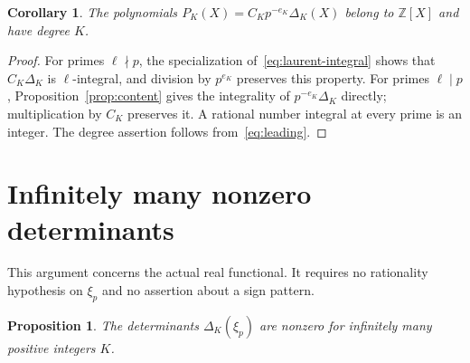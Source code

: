 \documentclass[11pt]{article}
\newtheorem{proposition}[theorem]{Proposition}
\newtheorem{corollary}[theorem]{Corollary}
\theoremstyle{remark}
\newcommand{\Z}{\mathbb Z}
\begin{document}
\begin{corollary}\label{cor:integer-polys}
The polynomials
$P_K(X)=C_Kp^{-e_K}\Delta_K(X)$ belong to $\Z[X]$ and have degree $K$.
\end{corollary}
\begin{proof}
For primes $\ell\nmid p$, the specialization
of~\eqref{eq:laurent-integral} shows that $C_K\Delta_K$ is
$\ell$-integral, and division by $p^{e_K}$ preserves this property.
For primes $\ell\mid p$, Proposition~\ref{prop:content} gives the
integrality of $p^{-e_K}\Delta_K$ directly; multiplication by $C_K$
preserves it. A rational number integral at every prime is an integer.
The degree assertion follows from~\eqref{eq:leading}.
\end{proof}

\section{Infinitely many nonzero determinants}

This argument concerns the actual real functional. It requires no
rationality hypothesis on $\xi_p$ and no assertion about a sign pattern.

\begin{proposition}\label{prop:normality}
The determinants $\Delta_K(\xi_p)$ are nonzero for infinitely many
positive integers $K$.
\end{proposition}
\end{document}
